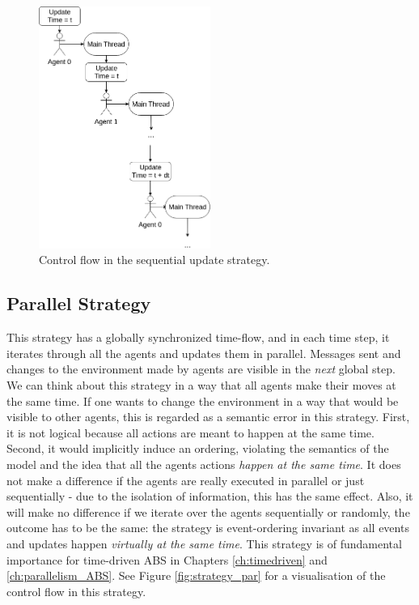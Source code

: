 \begin{figure}[H]
	\centering
	\includegraphics[width=0.5\textwidth, angle=0]{./fig/implabs/sequential.png}
	\caption[Control flow in the sequential update strategy]{Control flow in the sequential update strategy.}
	\label{fig:strategy_seq}
\end{figure}

\subsection{Parallel Strategy}
\label{sub:par_strategy}
This strategy has a globally synchronized time-flow, and in each time step, it iterates through all the agents and updates them in parallel. Messages sent and changes to the environment made by agents are visible in the \textit{next} global step. We can think about this strategy in a way that all agents make their moves at the same time.  If one wants to change the environment in a way that would be visible to other agents, this is regarded as a semantic error in this strategy. First, it is not logical because all actions are meant to happen at the same time. Second, it would implicitly induce an ordering, violating the semantics of the model and the idea that all the agents actions \textit{happen at the same time}.
It does not make a difference if the agents are really executed in parallel or just sequentially - due to the isolation of information, this has the same effect. Also, it will make no difference if we iterate over the agents sequentially or randomly, the outcome has to be the same: the strategy is event-ordering invariant as all events and updates happen \textit{virtually at the same time}. This strategy is of fundamental importance for time-driven ABS in Chapters \ref{ch:timedriven} and \ref{ch:parallelism_ABS}. See Figure \ref{fig:strategy_par} for a visualisation of the control flow in this strategy.

